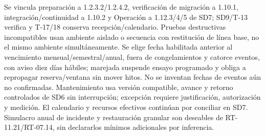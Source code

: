 Se vincula preparación a 1.2.3.2/1.2.4.2, verificación de migración a 1.10.1, integración/continuidad a 1.10.2 y Operación a 1.12.3/4/5 de SD7; SD9/T-13 verifica y T-17/18 conserva recepción/calendario. Pruebas destructivas incompatibles usan ambiente aislado o secuencia con restitución de línea base, no el mismo ambiente simultáneamente. Se elige fecha habilitada anterior al vencimiento mensual/semestral/anual, fuera de congelamientos y catorce eventos, con aviso diez días hábiles; marejada suspende ensayo programado y obliga a repropagar reserva/ventana sin mover hitos. No se inventan fechas de eventos aún no confirmadas. Mantenimiento usa versión compatible, avance y retorno controlados de SD6 sin interrupción; excepción requiere justificación, autorización y medición. El calendario y recursos efectivos continúan por conciliar en SD7. Simulacro anual de incidente y restauración granular son deseables de RT-11.21/RT-07.14, sin declararlos mínimos adicionales por inferencia. \parencites[art.~20; art.~21.3; pp.~14--16]{sd8-ba}[RT-10.05--07; cap.~20; p.~22]{sd8-bt}
